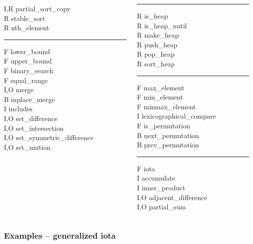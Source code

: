 \documentclass{beamer}
\newcommand{\heading}[1]{\frametitle{#1}}
\begin{document}
{{\begin{columns}[T]
\begin{column}{0.3\textwidth}
      I,R partial\_sort\_copy \\
      R stable\_sort \\
      R nth\_element \\
      \hrule
      F lower\_bound \\
      F upper\_bound \\
      F binary\_search \\
      F equal\_range \\
      I,O merge \\
      B inplace\_merge \\
      I includes \\
      I,O set\_difference \\
      I,O set\_intersection \\
      I,O set\_symmetric\_difference \\
      I,O set\_unition 
    \end{column}
    \begin{column}{0.3\textwidth}
      \hrule
      R is\_heap \\
      R is\_heap\_until \\
      R make\_heap \\
      R push\_heap \\
      R pop\_heap \\
      R sort\_heap \\
      \hrule
      F max\_element \\
      F min\_element \\
      F minmax\_element \\
      I lexicographical\_compare \\
      F is\_permutation \\
      B next\_permutation \\
      B prev\_permutation \\
      \hrule
      F iota \\
      I accumulate \\
      I inner\_product \\
      I,O adjacent\_difference \\
      I,O partial\_sum
   \end{column}
  \end{columns}


}







\begin{frame}[fragile]
 \heading{Examples -- generalized iota}
 

\end{frame}}
\end{document}
